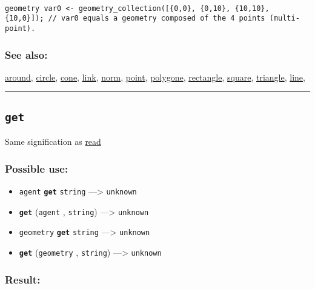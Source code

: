 \documentclass[]{book}
\providecommand{\tightlist}{%
  \setlength{\itemsep}{0pt}\setlength{\parskip}{0pt}}
\theoremstyle{definition}
\theoremstyle{definition}
\theoremstyle{definition}
\theoremstyle{remark}
\begin{document}
\begin{verbatim}
 
geometry var0 <- geometry_collection([{0,0}, {0,10}, {10,10}, {10,0}]); // var0 equals a geometry composed of the 4 points (multi-point).
\end{verbatim}

\subsubsection{See also:}\label{see-also-107}

\href{OperatorsAA\#around}{around}, \href{OperatorsBC\#circle}{circle},
\href{OperatorsBC\#cone}{cone}, \href{OperatorsIM\#link}{link},
\href{OperatorsNR\#norm}{norm}, \href{OperatorsNR\#point}{point},
\href{OperatorsSZ\#polygone}{polygone},
\href{OperatorsNR\#rectangle}{rectangle},
\href{OperatorsSZ\#square}{square},
\href{OperatorsSZ\#triangle}{triangle}, \href{OperatorsIM\#line}{line},

\begin{center}\rule{0.5\linewidth}{\linethickness}\end{center}

\subsection{\texorpdfstring{\texttt{get}}{get}}\label{get}

Same signification as \href{OperatorsNR\#read}{read}

\subsubsection{Possible use:}\label{possible-use-193}

\begin{itemize}
\tightlist
\item
  \texttt{agent} \textbf{\texttt{get}} \texttt{string} ---\textgreater{}
  \texttt{unknown}
\item
  \textbf{\texttt{get}} (\texttt{agent} , \texttt{string})
  ---\textgreater{} \texttt{unknown}
\item
  \texttt{geometry} \textbf{\texttt{get}} \texttt{string}
  ---\textgreater{} \texttt{unknown}
\item
  \textbf{\texttt{get}} (\texttt{geometry} , \texttt{string})
  ---\textgreater{} \texttt{unknown}
\end{itemize}

\subsubsection{Result:}\label{result-187}
\end{document}

